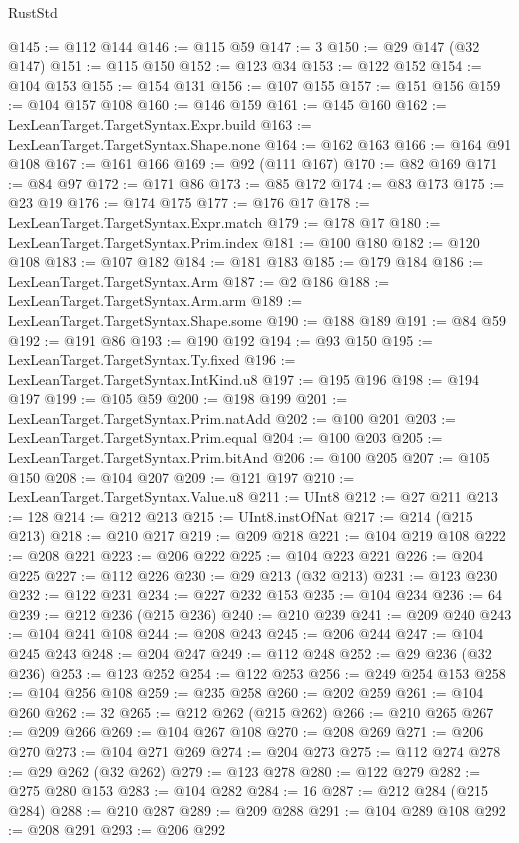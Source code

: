 \begin{lexlean}{RustStd}
\begin{coremodule}
@145 := @112 @144
@146 := @115 @59
@147 := 3
@150 := @29 @147 (@32 @147)
@151 := @115 @150
@152 := @123 @34
@153 := @122 @152
@154 := @104 @153
@155 := @154 @131
@156 := @107 @155
@157 := @151 @156
@159 := @104 @157 @108
@160 := @146 @159
@161 := @145 @160
@162 := LexLeanTarget.TargetSyntax.Expr.build
@163 := LexLeanTarget.TargetSyntax.Shape.none
@164 := @162 @163
@166 := @164 @91 @108
@167 := @161 @166
@169 := @92 (@111 @167)
@170 := @82 @169
@171 := @84 @97
@172 := @171 @86
@173 := @85 @172
@174 := @83 @173
@175 := @23 @19
@176 := @174 @175
@177 := @176 @17
@178 := LexLeanTarget.TargetSyntax.Expr.match
@179 := @178 @17
@180 := LexLeanTarget.TargetSyntax.Prim.index
@181 := @100 @180
@182 := @120 @108
@183 := @107 @182
@184 := @181 @183
@185 := @179 @184
@186 := LexLeanTarget.TargetSyntax.Arm
@187 := @2 @186
@188 := LexLeanTarget.TargetSyntax.Arm.arm
@189 := LexLeanTarget.TargetSyntax.Shape.some
@190 := @188 @189
@191 := @84 @59
@192 := @191 @86
@193 := @190 @192
@194 := @93 @150
@195 := LexLeanTarget.TargetSyntax.Ty.fixed
@196 := LexLeanTarget.TargetSyntax.IntKind.u8
@197 := @195 @196
@198 := @194 @197
@199 := @105 @59
@200 := @198 @199
@201 := LexLeanTarget.TargetSyntax.Prim.natAdd
@202 := @100 @201
@203 := LexLeanTarget.TargetSyntax.Prim.equal
@204 := @100 @203
@205 := LexLeanTarget.TargetSyntax.Prim.bitAnd
@206 := @100 @205
@207 := @105 @150
@208 := @104 @207
@209 := @121 @197
@210 := LexLeanTarget.TargetSyntax.Value.u8
@211 := UInt8
@212 := @27 @211
@213 := 128
@214 := @212 @213
@215 := UInt8.instOfNat
@217 := @214 (@215 @213)
@218 := @210 @217
@219 := @209 @218
@221 := @104 @219 @108
@222 := @208 @221
@223 := @206 @222
@225 := @104 @223 @221
@226 := @204 @225
@227 := @112 @226
@230 := @29 @213 (@32 @213)
@231 := @123 @230
@232 := @122 @231
@234 := @227 @232 @153
@235 := @104 @234
@236 := 64
@239 := @212 @236 (@215 @236)
@240 := @210 @239
@241 := @209 @240
@243 := @104 @241 @108
@244 := @208 @243
@245 := @206 @244
@247 := @104 @245 @243
@248 := @204 @247
@249 := @112 @248
@252 := @29 @236 (@32 @236)
@253 := @123 @252
@254 := @122 @253
@256 := @249 @254 @153
@258 := @104 @256 @108
@259 := @235 @258
@260 := @202 @259
@261 := @104 @260
@262 := 32
@265 := @212 @262 (@215 @262)
@266 := @210 @265
@267 := @209 @266
@269 := @104 @267 @108
@270 := @208 @269
@271 := @206 @270
@273 := @104 @271 @269
@274 := @204 @273
@275 := @112 @274
@278 := @29 @262 (@32 @262)
@279 := @123 @278
@280 := @122 @279
@282 := @275 @280 @153
@283 := @104 @282
@284 := 16
@287 := @212 @284 (@215 @284)
@288 := @210 @287
@289 := @209 @288
@291 := @104 @289 @108
@292 := @208 @291
@293 := @206 @292

\end{coremodule}
\end{lexlean}
